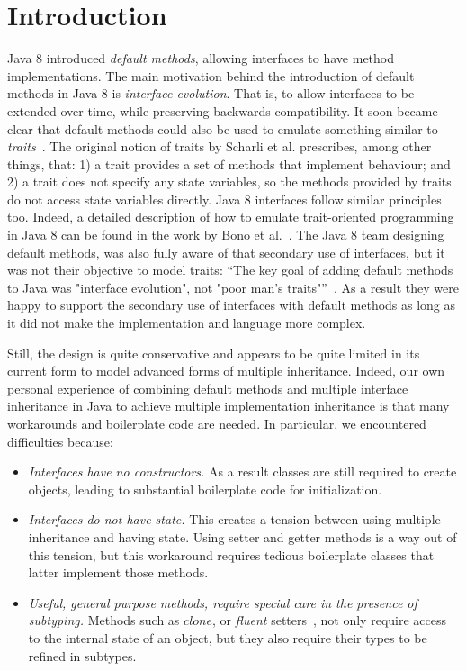 \section{Introduction}\label{sec:intro}

Java 8 introduced \emph{default methods}, allowing interfaces to have
method implementations. The main motivation behind the introduction of
default methods in Java 8 is \emph{interface evolution}. That is, to
allow interfaces to be extended over time, while preserving backwards
compatibility. It soon became clear that default methods could also be
used to emulate something similar to \emph{traits}~\cite{scharli03traits}. The
original notion of traits by Scharli et al. prescribes, among other
things, that: 1) a trait provides a set of methods that implement
behaviour; and 2) a trait does not specify any state variables, so the
methods provided by traits do not access state variables
directly. Java 8 interfaces follow similar principles too. Indeed, a
detailed description of how to emulate trait-oriented programming in
Java 8 can be found in the work by Bono et al.~\cite{bono14}. The Java 8
team designing default methods, was also fully aware of that secondary
use of interfaces, but it was not their objective to model traits:
``The key goal of adding default methods to Java was "interface
evolution", not "poor man's traits"''~\cite{goetz13default}. As a result
they were happy to support the secondary use of interfaces with
default methods as long as it did not make the implementation and
language more complex.
 
Still, the design is quite conservative and appears to be quite limited
 in its current form to model advanced forms of multiple inheritance.
Indeed, our own personal experience of combining default methods 
and multiple interface inheritance in Java to achieve multiple implementation 
inheritance is that many workarounds and boilerplate code are needed. 
In particular, we encountered difficulties because:

\begin{itemize}

\item {\em Interfaces have no constructors.} As a result classes are 
still required to create objects, leading to substantial boilerplate 
code for initialization.

\item {\em Interfaces do not have state.} This creates a tension between 
 using multiple inheritance and having state. Using setter and
  getter methods is a way out of this tension, but this workaround
  requires tedious boilerplate classes that latter implement those
  methods.

\item {\em Useful, general purpose methods, require special care in
  the presence of subtyping.} Methods such as $clone$, or
  \emph{fluent} setters~\cite{fowler2005fluentinterface}, not only require access to the
  internal state of an object, but they also require their types to be
  refined in subtypes.

\end{itemize}

